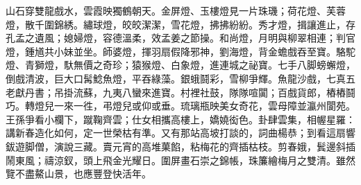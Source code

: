 \begin{myquote}
山石穿雙龍戲水，雲霞映獨鶴朝天。金屏燈、玉樓燈見一片珠璣；荷花燈、芙蓉燈，散千圍錦綉。繡球燈，皎皎潔潔，雪花燈，拂拂紛紛。秀才燈，揖讓進止，存孔孟之遺風；{}媳婦燈，容德溫柔，效孟姜之節操。和尚燈，月明與柳翠相連；判官燈，鍾馗共小妹並坐。師婆燈，揮羽扇假降邪神，劉海燈，背金蟾戲吞至寶。駱駝燈、青獅燈，馱無價之奇珍；猿猴燈、白象燈，進連城之祕寶。七手八脚螃蠏燈，倒戲清波，巨大口髯鯰魚燈，平吞綠藻。銀蛾鬪彩，雪柳爭輝。魚龍沙戲，七真五老獻丹書；吊掛流蘇，九夷八蠻來進寶。村裡社鼓，隊隊喧闐；百戲貨郎，樁樁鬪巧。轉燈兒一來一徃，弔燈兒或仰或垂。琉璃瓶映美女奇花，雲母障並瀛州閬苑。王孫爭看小欄下，蹴鞠齊雲；仕女相攜高樓上，嬌嬈衒色。卦肆雲集，相幄星羅：講新春造化如何，定一世榮枯有準。又有那站高坡打談的，詞曲楊恭；到看這扇響鈸遊脚僧，演說三藏。賣元宵的高堆菓餡，粘梅花的齊插枯枝。剪春娥，鬂邊斜插鬧東風；禱涼釵，頭上飛金光耀日。圍屏畫石崇之錦帳，珠簾繪梅月之雙清。雖然覽不盡鰲山景，也應豐登快活年。
\end{myquote}

